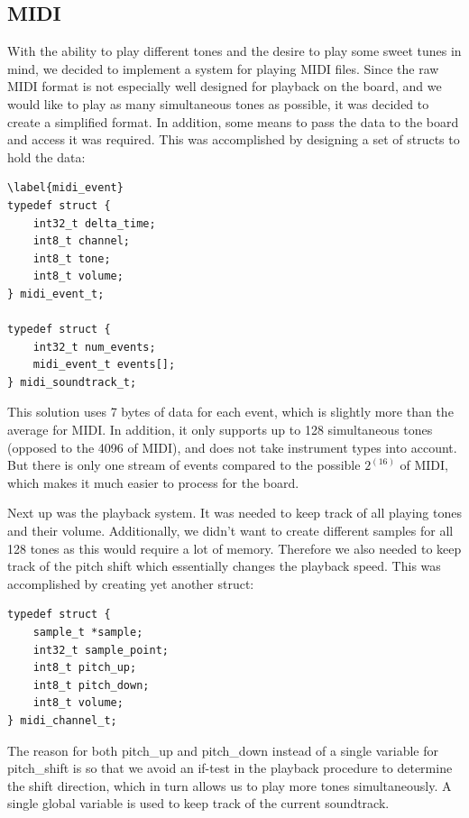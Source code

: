 \documentclass[a4paper,12pt]{article}
\begin{document}
\subsection{MIDI}

With the ability to play different tones and the desire to play some sweet tunes in mind, we decided to implement a system for playing MIDI files. Since the raw MIDI format is not especially well designed for playback on the board, and we would like to play as many simultaneous tones as possible, it was decided to create a simplified format. In addition, some means to pass the data to the board and access it was required. This was accomplished by designing a set of structs to hold the data:

\begin{verbatim}\label{midi_event}
typedef struct {
    int32_t delta_time;
    int8_t channel;
    int8_t tone;
    int8_t volume;
} midi_event_t;

typedef struct {
    int32_t num_events;
    midi_event_t events[];
} midi_soundtrack_t;
\end{verbatim}

This solution uses 7 bytes of data for each event, which is slightly more than the average for MIDI. In addition, it only supports up to 128 simultaneous tones (opposed to the 4096 of MIDI), and does not take instrument types into account. But there is only one stream of events compared to the possible $2^(16)$ of MIDI, which makes it much easier to process for the board.

Next up was the playback system. It was needed to keep track of all playing tones and their volume. Additionally, we didn’t want to create different samples for all 128 tones as this would require a lot of memory. Therefore we also needed to keep track of the pitch shift which essentially changes the playback speed. This was accomplished by creating yet another struct:

\begin{verbatim}
typedef struct {
    sample_t *sample;
    int32_t sample_point;
    int8_t pitch_up;
    int8_t pitch_down;
    int8_t volume;
} midi_channel_t;
\end{verbatim}

The reason for both pitch\_up and pitch\_down instead of a single variable for pitch\_shift is so that we avoid an if-test in the playback procedure to determine the shift direction, which in turn allows us to play more tones simultaneously. A single global variable is used to keep track of the current soundtrack.
\end{document}

